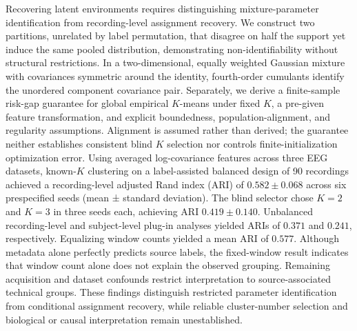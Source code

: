 Recovering latent environments requires distinguishing mixture-parameter
identification from recording-level assignment recovery. We construct
two partitions, unrelated by label permutation, that disagree on half
the support yet induce the same pooled distribution, demonstrating
non-identifiability without structural restrictions. In a
two-dimensional, equally weighted Gaussian mixture with covariances
symmetric around the identity, fourth-order cumulants identify the
unordered component covariance pair. Separately, we derive a
finite-sample risk-gap guarantee for global empirical \(K\)-means under
fixed \(K\), a pre-given feature transformation, and explicit
boundedness, population-alignment, and regularity assumptions. Alignment
is assumed rather than derived; the guarantee neither establishes
consistent blind \(K\) selection nor controls finite-initialization
optimization error. Using averaged log-covariance features across three
EEG datasets, known-\(K\) clustering on a label-assisted balanced design
of 90 recordings achieved a recording-level adjusted Rand index (ARI) of
\(0.582\pm0.068\) across six prespecified seeds (mean ± standard
deviation). The blind selector chose \(K=2\) and \(K=3\) in three seeds
each, achieving ARI \(0.419\pm0.140\). Unbalanced recording-level and
subject-level plug-in analyses yielded ARIs of \(0.371\) and \(0.241\),
respectively. Equalizing window counts yielded a mean ARI of \(0.577\).
Although metadata alone perfectly predicts source labels, the
fixed-window result indicates that window count alone does not explain
the observed grouping. Remaining acquisition and dataset confounds
restrict interpretation to source-associated technical groups. These
findings distinguish restricted parameter identification from
conditional assignment recovery, while reliable cluster-number selection
and biological or causal interpretation remain unestablished.
